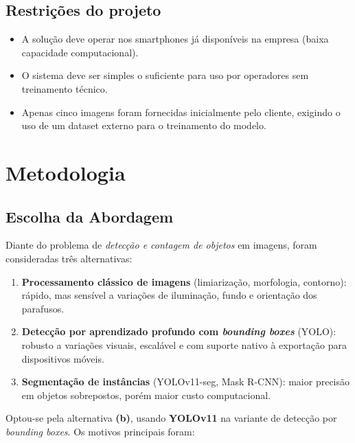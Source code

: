 \documentclass[12pt,a4paper]{article}
\begin{document}
\subsection{Restri\c{c}\~oes do projeto}

\begin{itemize}[leftmargin=*]
  \item A solu\c{c}\~ao deve operar nos smartphones j\'a dispon\'iveis na empresa (baixa
        capacidade computacional).
  \item O sistema deve ser simples o suficiente para uso por operadores sem treinamento
        t\'ecnico.
  \item Apenas cinco imagens foram fornecidas inicialmente pelo cliente, exigindo o uso de
        um dataset externo para o treinamento do modelo.
\end{itemize}

\section{Metodologia}

\subsection{Escolha da Abordagem}

Diante do problema de \emph{detec\c{c}\~ao e contagem de objetos} em imagens, foram
consideradas tr\^es alternativas:

\begin{enumerate}[label=\alph*)]
  \item \textbf{Processamento cl\'assico de imagens} (limiariza\c{c}\~ao, morfologia,
        contorno): r\'apido, mas sens\'ivel a varia\c{c}\~oes de ilumina\c{c}\~ao,
        fundo e orienta\c{c}\~ao dos parafusos.
  \item \textbf{Detec\c{c}\~ao por aprendizado profundo com \emph{bounding boxes}}
        (YOLO): robusto a varia\c{c}\~oes visuais, escal\'avel e com suporte nativo
        \`a exporta\c{c}\~ao para dispositivos m\'oveis.
  \item \textbf{Segmenta\c{c}\~ao de inst\^ancias} (YOLOv11-seg, Mask R-CNN): maior
        precis\~ao em objetos sobrepostos, por\'em maior custo computacional.
\end{enumerate}

Optou-se pela alternativa \textbf{(b)}, usando \textbf{YOLOv11} na variante de
detec\c{c}\~ao por \emph{bounding boxes}. Os motivos principais foram:
\end{document}
